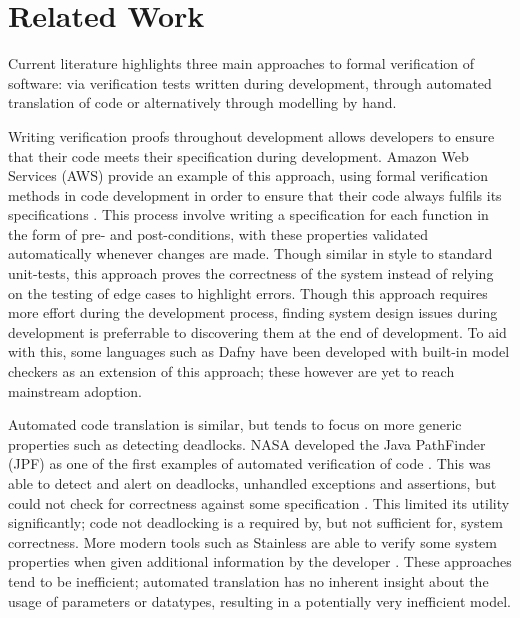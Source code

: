 \section{Related Work}


Current literature highlights three main approaches to formal verification of software: via verification tests written during development, through automated translation of code or alternatively through modelling by hand.

Writing verification proofs throughout development allows developers to ensure that their code meets their specification during development.
Amazon Web Services (AWS) provide an example of this approach, using formal verification methods in code development in order to ensure that their code always fulfils its specifications \cite{Amazon1, Amazon2}. This process involve writing a specification for each function in the form of pre- and post-conditions, with these properties validated automatically whenever changes are made. 
Though similar in style to standard unit-tests, this approach proves the correctness of the system instead of relying on the testing of edge cases to highlight errors. %
Though this approach requires more effort during the development process, finding system design issues during development is preferrable to discovering them at the end of development.
To aid with this, some languages such as Dafny \cite{Dafny} have been developed with built-in model checkers as an extension of this approach; these however are yet to reach mainstream adoption.

Automated code translation is similar, but tends to focus on more generic properties such as detecting deadlocks. NASA developed the Java PathFinder (JPF) as one of the first examples of automated verification of code \cite{NASA1}. This was able to detect and alert on deadlocks, unhandled exceptions and assertions, but could not check for correctness against some specification \cite{NASA2}. This limited its utility significantly; code not deadlocking is a required by, but not sufficient for, system correctness. %
More modern tools such as Stainless are able to verify some system properties when given additional information by the developer \cite{C4DT}. These approaches tend to be inefficient; automated translation has no inherent insight about the usage of parameters or datatypes, resulting in a potentially very inefficient model.

